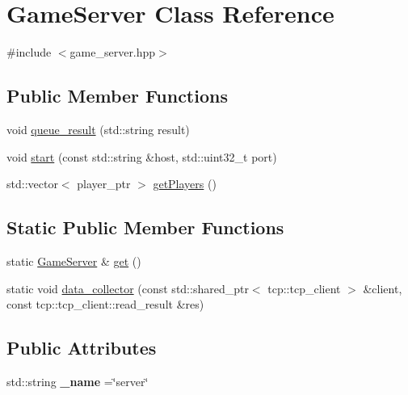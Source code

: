 \hypertarget{classGameServer}{}\section{Game\+Server Class Reference}
\label{classGameServer}


{\ttfamily \#include $<$game\+\_\+server.\+hpp$>$}

\subsection*{Public Member Functions}
\begin{DoxyCompactItemize}
\item 
void \hyperlink{classGameServer_a1059a53ce3bd5fe9fad31a16c6310104}{queue\+\_\+result} (std\+::string result)
\item 
void \hyperlink{classGameServer_a8c6534df2bb4196b7bdcd8c4f15ce8fc}{start} (const std\+::string \&host, std\+::uint32\+\_\+t port)
\item 
std\+::vector$<$ player\+\_\+ptr $>$ \hyperlink{classGameServer_a24b8a605a18de2c5a1e183e505cd7684}{get\+Players} ()
\end{DoxyCompactItemize}
\subsection*{Static Public Member Functions}
\begin{DoxyCompactItemize}
\item 
static \hyperlink{classGameServer}{Game\+Server} \& \hyperlink{classGameServer_ae0ac206438c3c9af8eb0f52575faa597}{get} ()
\item 
static void \hyperlink{classGameServer_ac54878b70dc19acf32ff914708b409f1}{data\+\_\+collector} (const std\+::shared\+\_\+ptr$<$ tcp\+::tcp\+\_\+client $>$ \&client, const tcp\+::tcp\+\_\+client\+::read\+\_\+result \&res)
\end{DoxyCompactItemize}
\subsection*{Public Attributes}
\begin{DoxyCompactItemize}
\item 
std\+::string {\bfseries \+\_\+name} =\char`\"{}server\char`\"{}\hypertarget{classGameServer_a48c6dc5a829d372970dbe98b0dc99d16}{}\label{classGameServer_a48c6dc5a829d372970dbe98b0dc99d16}

\end{DoxyCompactItemize}

